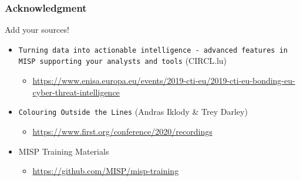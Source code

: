 \begin{frame}
    \frametitle{Acknowledgment}
    Add your sources!
    \begin{itemize}
        \item \texttt{Turning data into actionable intelligence - advanced features in MISP supporting your analysts and tools} (CIRCL.lu)
        \begin{itemize}
            \item \url{https://www.enisa.europa.eu/events/2019-cti-eu/2019-cti-eu-bonding-eu-cyber-threat-intelligence}
        \end{itemize}
        \item \texttt{Colouring Outside the Lines} (Andras Iklody \& Trey Darley)
        \begin{itemize}
            \item \url{https://www.first.org/conference/2020/recordings}
        \end{itemize}
        \item MISP Training Materials
        \begin{itemize}
            \item \url{https://github.com/MISP/misp-training}
        \end{itemize}
    \end{itemize}
\end{frame}